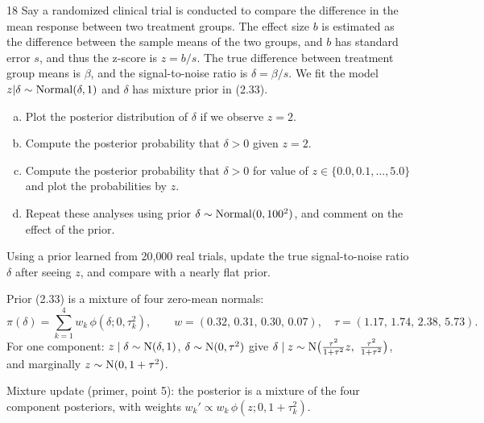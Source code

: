 \documentclass[11pt]{article}
\begin{document}

\begin{problem}{18}
Say a randomized clinical trial is conducted to compare the difference in the mean response between two treatment groups. The effect size $b$ is estimated as the difference between the sample means of the two groups, and $b$ has standard error $s$, and thus the z-score is $z=b/s$. The true difference between treatment group means is $\beta$, and the signal-to-noise ratio is $\delta=\beta/s$. We fit the model $z|\delta\sim\mathrm{Normal}(\delta,1)$ and $\delta$ has mixture prior in (2.33).
\begin{enumerate}[(a)]
\item Plot the posterior distribution of $\delta$ if we observe $z=2$.
\item Compute the posterior probability that $\delta>0$ given $z=2$.
\item Compute the posterior probability that $\delta>0$ for value of $z\in\{0.0,0.1,\dots,5.0\}$ and plot the probabilities by $z$.
\item Repeat these analyses using prior $\delta\sim\mathrm{Normal}(0,100^2)$, and comment on the effect of the prior.
\end{enumerate}
\end{problem}

\begin{restate}
Using a prior learned from 20{,}000 real trials, update the true signal-to-noise ratio $\delta$ after seeing $z$, and compare with a nearly flat prior.
\end{restate}

\begin{recall}
Prior (2.33) is a mixture of four zero-mean normals:
\[
\pi(\delta)=\sum_{k=1}^4w_k\,\phi(\delta;0,\tau_k^2),\qquad w=(0.32,\,0.31,\,0.30,\,0.07),\quad \tau=(1.17,\,1.74,\,2.38,\,5.73).
\]
For one component: $z\mid\delta\sim\mathrm{N}(\delta,1)$, $\delta\sim\mathrm{N}(0,\tau^2)$ give $\delta\mid z\sim\dist N\big(\frac{\tau^2}{1+\tau^2}z,\ \frac{\tau^2}{1+\tau^2}\big)$, and marginally $z\sim\mathrm{N}(0,1+\tau^2)$.
\end{recall}

\begin{keyidea}
Mixture update (primer, point 5): the posterior is a mixture of the four component posteriors, with weights $w_k'\propto w_k\,\phi(z;0,1+\tau_k^2)$.
\end{keyidea}
\end{document}
